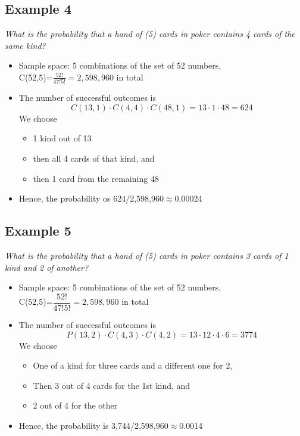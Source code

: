 \documentclass{article}[18pt]
\begin{document}
\subsection{Example 4}
\textit{What is the probability that a hand of (5) cards in poker contains 4 cards of the same kind?}
\begin{itemize}
	\item Sample space: 5 combinations of the set of 52 numbers,\\
	C(52,5)=$\frac{52!}{47!5!}=2,598,960$ in total
	\item The number of successful outcomes is
	$$C(13,1)\cdot C(4,4)\cdot C(48,1)=13\cdot1\cdot48=624$$
	We choose
	\begin{itemize}
		\item 1 kind out of 13
		\item then all 4 cards of that kind, and
		\item then 1 card from the remaining 48
	\end{itemize}
	\item Hence, the probability os 624/2,598,960$\approx$0.00024
\end{itemize}

\subsection{Example 5}
\textit{What is the probability that a hand of (5) cards in poker contains 3 cards of 1 kind and 2 of another?}
\begin{itemize}
	\item Sample space: 5 combinations of the set of 52 numbers,\\
	C(52,5)=$\dfrac{52!}{47!5!}=2,598,960$ in total
	\item The number of successful outcomes is
	$$P(13,2)\cdot C(4,3) \cdot C(4,2)=13\cdot12\cdot4\cdot6=3774$$
	We choose
	\begin{itemize}
	\item One of a kind for three cards and a different one for 2,
	\item Then 3 out of 4 cards for the 1st kind, and
	\item 2 out of 4 for the other
	\end{itemize}
\item Hence, the probability is 3,744/2,598,960$\approx$0.0014
\end{itemize}
\end{document}
